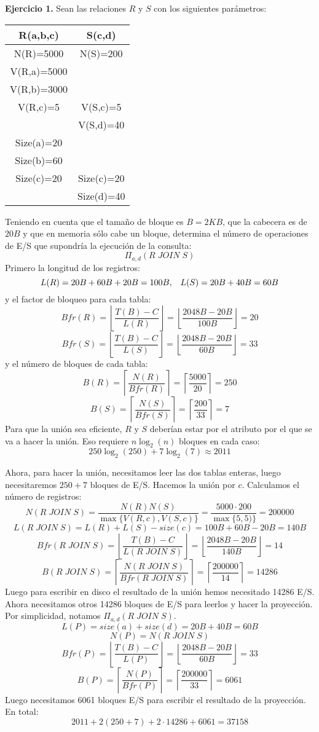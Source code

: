 \documentclass[12pt]{report}
\begin{document}
\textbf{Ejercicio 1.} Sean las relaciones $R$ y $S$ con los siguientes parámetros:

\begin{center}
\begin{tabular}{|c|c|}
\hline 
R(a,b,c) & S(c,d) \\ 
\hline 
N(R)=5000 & N(S)=200 \\ 
\hline 
V(R,a)=5000 &   \\ 
\hline 
V(R,b)=3000 &   \\ 
\hline 
V(R,c)=5 & V(S,c)=5 \\ 
\hline 
  & V(S,d)=40 \\ 
\hline 
Size(a)=20 &   \\ 
\hline 
Size(b)=60 &   \\ 
\hline 
Size(c)=20 & Size(c)=20 \\ 
\hline 
  & Size(d)=40 \\ 
\hline 
\end{tabular} 
\end{center} 

Teniendo en cuenta que el tamaño de bloque es $B=2KB$, que la cabecera es de $20B$ y que en memoria sólo cabe un bloque, determina el número de operaciones de E/S que supondría la ejecución de la consulta:
\[
\Pi_{a,d}(R\;JOIN\;S)
\]
Primero la longitud de los registros:
\[
L(R)=20B+60B+20B=100B, \;\;\; L(S)=20B+40B=60B
\]
y el factor de bloqueo para cada tabla:
\[
Bfr(R)=\left\lfloor\frac{T(B)-C}{L(R)}\right\rfloor=\left\lfloor\frac{2048B-20B}{100B}\right\rfloor=20
\]
\[
Bfr(S)=\left\lfloor\frac{T(B)-C}{L(S)}\right\rfloor=\left\lfloor\frac{2048B-20B}{60B}\right\rfloor=33
\]
y el número de bloques de cada tabla:
\[
B(R)=\left\lceil\frac{N(R)}{Bfr(R)}\right\rceil=\left\lceil\frac{5000}{20}\right\rceil= 250
\]
\[
B(S)=\left\lceil\frac{N(S)}{Bfr(S)}\right\rceil=\left\lceil\frac{200}{33}\right\rceil= 7
\]
Para que la unión sea eficiente, $R$ y $S$ deberían estar por el atributo por el que se va a hacer la unión. Eso requiere $n\log_2(n)$ bloques en cada caso:
\[
250\log_2(250)+7\log_2(7)\approx 2011
\]

Ahora, para hacer la unión, necesitamos leer las dos tablas enteras, luego necesitaremos $250+7$ bloques de E/S. Hacemos la unión por $c$. Calculamos el número de registros:
\[
N(R\;JOIN\;S)=\frac{N(R)N(S)}{\max\{V(R,c),V(S,c)\}}=\frac{5000\cdot 200}{\max\{5,5)\}}=200000
\]
\[
L(R\;JOIN\;S)=L(R)+L(S)-size(c)=100B+60B-20B=140B
\]
\[
Bfr(R\;JOIN\;S)=\left\lfloor\frac{T(B)-C}{L(R\;JOIN\;S)}\right\rfloor=\left\lfloor\frac{2048B-20B}{140B}\right\rfloor=14
\]
\[
B(R\;JOIN\;S)=\left\lceil\frac{N(R\;JOIN\;S)}{Bfr(R\;JOIN\;S)}\right\rceil=\left\lceil\frac{200000}{14}\right\rceil= 14286
\]
Luego para escribir en disco el resultado de la unión hemos necesitado 14286 E/S. Ahora necesitamos otros 14286 bloques de E/S para leerlos y hacer la proyección. Por simplicidad, notamos $\Pi_{a,d}(R\;JOIN\;S)$.
\[
L(P)=size(a)+size(d)=20B+40B=60B 
\]
\[
N(P)=N(R\;JOIN\;S)
\]
\[
Bfr(P)=\left\lfloor\frac{T(B)-C}{L(P)}\right\rfloor=\left\lfloor\frac{2048B-20B}{60B}\right\rfloor=33
\]
\[
B(P)=\left\lceil\frac{N(P)}{Bfr(P)}\right\rceil=\left\lceil\frac{200000}{33}\right\rceil= 6061
\]
Luego necesitamos 6061 bloques E/S para escribir el resultado de la proyección. En total:
\[
2011+2(250+7)+2\cdot 14286+6061=37158
\]
\end{document}
